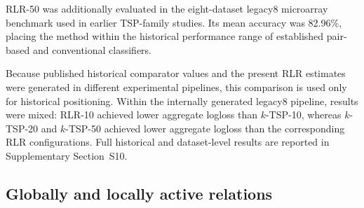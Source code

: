 \documentclass[preprint,12pt,a4paper]{elsarticle}
\begin{document}
RLR-50 was additionally evaluated in the eight-dataset legacy8 microarray benchmark used in earlier TSP-family studies. Its mean accuracy was 82.96\%, placing the method within the historical performance range of established pair-based and conventional classifiers.

Because published historical comparator values and the present RLR estimates were generated in different experimental pipelines, this comparison is used only for historical positioning. Within the internally generated legacy8 pipeline, results were mixed: RLR-10 achieved lower aggregate logloss than $k$-TSP-10, whereas $k$-TSP-20 and $k$-TSP-50 achieved lower aggregate logloss than the corresponding RLR configurations. Full historical and dataset-level results are reported in Supplementary Section~S10.

\subsection{Globally and locally active relations}
\end{document}
